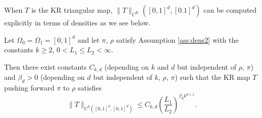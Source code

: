 When $T$ is  the KR triangular map, $\|T\|_{C^K}([0,1]^d,[0.1]^d)$ can be computed explicitly in terms of densities as we see below. 
\begin{theorem}\label{thm:CkNormTriangular}
  Let $\Omega_0=\Omega_1=[0,1]^d$ and let $\pi$, $\rho$ satisfy
    Assumption \ref{ass:dens2} with the constants $k\ge 2$,
    $0<L_1\le L_2<\infty$.

    Then there exist constants $C_{k,d}$ (depending on $k$ and $d$ but independent of
    $\rho$, $\pi$)
    and $\beta_d>0$ (depending on $d$ but independent of $k$,
    $\rho$, $\pi$)
    such that the KR map $T$ pushing forward $\pi$
    to $\rho$ satisfies
    \begin{equation}
      \|T\|_{C^k([0,1]^d, [0,1]^d)} \leq C_{k,d}\left(\frac{L_1}{L_2}\right)^{\beta_d k^{d+1}}.
    \end{equation}
\end{theorem}
